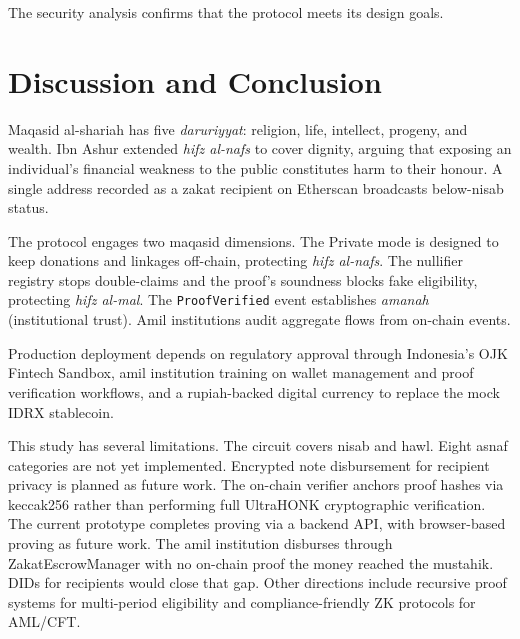 \documentclass[conference]{IEEEtran}
\begin{document}
The security analysis confirms that the protocol meets its design goals\cite{b_zkp_financial}\cite{b_zkfi}.

\section{Discussion and Conclusion}

Maqasid al-shariah has five \textit{daruriyyat}: religion, life, intellect, progeny, and wealth\cite{b_maqasid_data}\cite{b_maqasid_fintech}. Ibn Ashur extended \textit{hifz al-nafs} to cover dignity, arguing that exposing an individual's financial weakness to the public constitutes harm to their honour\cite{b_maqasid_privacy}. A single address recorded as a zakat recipient on Etherscan broadcasts below-nisab status\cite{b_maqasid_blockchain}\cite{b_maqasid_data}.

The protocol engages two maqasid dimensions\cite{b_maqasid_data}\cite{b_maqasid_privacy}. The Private mode is designed to keep donations and linkages off-chain, protecting \textit{hifz al-nafs}\cite{b_maqasid_privacy}\cite{b_zkfi}. The nullifier registry stops double-claims and the proof's soundness blocks fake eligibility, protecting \textit{hifz al-mal}\cite{b_aztec}\cite{b_zkp_blockchain}. The \texttt{ProofVerified} event establishes \textit{amanah} (institutional trust)\cite{b_maqasid_data}. Amil institutions audit aggregate flows from on-chain events\cite{b_maqasid_privacy}\cite{b_zkp_financial}.

Production deployment depends on regulatory approval through Indonesia's OJK Fintech Sandbox\cite{b_fatwa_crypto}\cite{b_maqasid_fintech}, amil institution training on wallet management and proof verification workflows\cite{b_maqasid_data}, and a rupiah-backed digital currency to replace the mock IDRX stablecoin\cite{b_halal_crypto}\cite{b_fatwa_crypto}.

This study has several limitations. The circuit covers nisab and hawl\cite{b_noir}\cite{b_maqasid_data}. Eight asnaf categories are not yet implemented\cite{b_maqasid_data}\cite{b_zakat_acm}. Encrypted note disbursement for recipient privacy is planned as future work\cite{b_bbs_w3c}. The on-chain verifier anchors proof hashes via keccak256 rather than performing full UltraHONK cryptographic verification\cite{b_aztec}\cite{b_zkp_blockchain}. The current prototype completes proving via a backend API, with browser-based proving as future work\cite{b_pwa_survey}. The amil institution disburses through ZakatEscrowManager with no on-chain proof the money reached the mustahik\cite{b_maqasid_data}\cite{b_zakat_transparency}. DIDs for recipients would close that gap\cite{b_zkp_idm}\cite{b_bbs_w3c}. Other directions include recursive proof systems for multi-period eligibility\cite{b_hybrid_zk}\cite{b_zkp_circuits} and compliance-friendly ZK protocols for AML/CFT\cite{b_zkfi}\cite{b_zkp_financial}.
\end{document}
